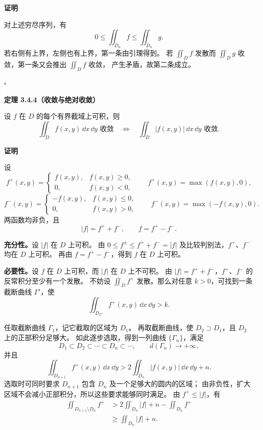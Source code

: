 \textbf{证明}

对上述穷尽序列，有
\[
0\le\displaystyle\iint_{D_n}f\le\displaystyle\iint_{D_n}g.
\]
若右侧有上界，左侧也有上界，第一条由引理得到。
若 $\displaystyle\iint_Df$ 发散而 $\displaystyle\iint_Dg$ 收敛，第一条又会推出 $\displaystyle\iint_Df$ 收敛，
产生矛盾，故第二条成立。


$\square$





\textbf{定理 3.4.4（收敛与绝对收敛）}


设 $f$ 在 $D$ 的每个有界截域上可积，则
\[
\displaystyle\iint_Df(x,y)\,\dd x\,\dd y\text{ 收敛}
\quad\Longleftrightarrow\quad
\displaystyle\iint_D|f(x,y)|\,\dd x\,\dd y\text{ 收敛}.
\]





\textbf{证明}

设
\[
f^+(x,y)=\begin{cases}f(x,y),&f(x,y)\ge0,\\0,&f(x,y)<0,\end{cases}
\qquad f^+(x,y)=\max(f(x,y),0),
\]
\[
f^-(x,y)=\begin{cases}-f(x,y),&f(x,y)\le0,\\0,&f(x,y)>0,\end{cases}
\qquad f^-(x,y)=\max(-f(x,y),0).
\]
两函数均非负，且
\[
|f|=f^++f^-,\qquad f=f^+-f^-.
\]

\textbf{充分性。}设 $|f|$ 在 $D$ 上可积。
由 $0\le f^\pm\le f^++f^-=|f|$ 及比较判别法，$f^+$、$f^-$ 均在 $D$ 上可积。
再由 $f=f^+-f^-$，得到 $f$ 在 $D$ 上可积。

\textbf{必要性。}设 $f$ 在 $D$ 上可积，而 $|f|$ 在 $D$ 上不可积。
由 $|f|=f^++f^-$，$f^+$、$f^-$ 的反常积分至少有一个发散。
不妨设 $\displaystyle\iint_Df^+$ 发散。那么对任意 $k>0$，可找到一条截断曲线 $\Gamma'$，使
\[
\displaystyle\iint_{D_{\Gamma'}}f^+(x,y)\,\dd x\,\dd y>k.
\]

任取截断曲线 $\Gamma_1$，记它截取的区域为 $D_1$。
再取截断曲线，使 $D_2\supset D_1$，且 $D_2$ 上的正部积分足够大。
如此逐步选取，得到一列曲线 $\{\Gamma_n\}$，满足
\[
D_1\subset D_2\subset\cdots\subset D_n\subset\cdots,\qquad
d(\Gamma_n)\longrightarrow+\infty,
\]
并且
\[
\displaystyle\iint_{D_{n+1}}f^+(x,y)\,\dd x\,\dd y
>2\displaystyle\iint_{D_n}|f(x,y)|\,\dd x\,\dd y+n.
\]
选取时可同时要求 $D_{n+1}$ 包含 $D_n$ 及一个足够大的圆内的区域；
由非负性，扩大区域不会减小正部积分，所以这些要求能够同时满足。
由 $f^+\le|f|$，有
\begin{align*}
\displaystyle\iint_{D_{n+1}\setminus D_n}f^+
&>2\displaystyle\iint_{D_n}|f|+n-\displaystyle\iint_{D_n}f^+\\
&\ge\displaystyle\iint_{D_n}|f|+n.
\end{align*}

